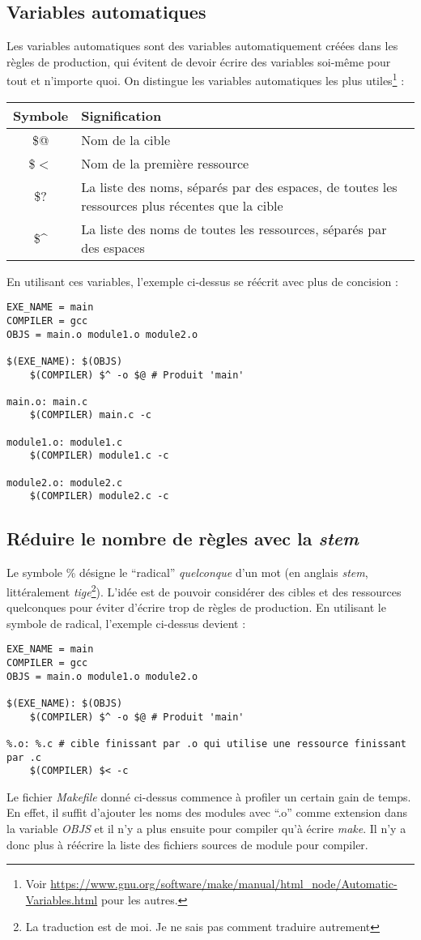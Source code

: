 \documentclass[../../../main.tex]{subfiles}
\begin{document}
\subsection{Variables automatiques}
Les variables automatiques sont des variables automatiquement créées dans les règles de production, qui évitent de devoir écrire des variables soi-même pour tout et n'importe quoi. On distingue les variables automatiques les plus utiles\footnote{Voir \url{https://www.gnu.org/software/make/manual/html_node/Automatic-Variables.html} pour les autres.} :
\begin{center}
\begin{tabular}{c|l}
Symbole & Signification \\
\hline
\$@ & Nom de la cible \\
\$$<$ & Nom de la première ressource \\
\$? & La liste des noms, séparés par des espaces, de toutes les ressources plus récentes que la cible \\
\$\^ & La liste des noms de toutes les ressources, séparés par des espaces
\end{tabular}
\end{center}
En utilisant ces variables, l'exemple ci-dessus se réécrit avec plus de concision :
\begin{verbatim}
EXE_NAME = main
COMPILER = gcc
OBJS = main.o module1.o module2.o

$(EXE_NAME): $(OBJS)
	$(COMPILER) $^ -o $@ # Produit 'main'

main.o: main.c
	$(COMPILER) main.c -c

module1.o: module1.c
	$(COMPILER) module1.c -c

module2.o: module2.c
	$(COMPILER) module2.c -c
\end{verbatim}
\subsection{Réduire le nombre de règles avec la \textit{stem}}
Le symbole \% désigne le ``radical'' \textit{quelconque} d'un mot (en anglais \textit{stem}, littéralement \textit{tige}\footnote{La traduction est de moi. Je ne sais pas comment traduire autrement}). L'idée est de pouvoir considérer des cibles et des ressources quelconques pour éviter d'écrire trop de règles de production. En utilisant le symbole de radical, l'exemple ci-dessus devient :
\begin{verbatim}
EXE_NAME = main
COMPILER = gcc
OBJS = main.o module1.o module2.o

$(EXE_NAME): $(OBJS)
	$(COMPILER) $^ -o $@ # Produit 'main'

%.o: %.c # cible finissant par .o qui utilise une ressource finissant par .c
	$(COMPILER) $< -c
\end{verbatim}
Le fichier \textit{Makefile} donné ci-dessus commence à profiler un certain gain de temps. En effet, il suffit d'ajouter les noms des modules avec ``.o'' comme extension dans la variable \textit{OBJS} et il n'y a plus ensuite pour compiler qu'à écrire \textit{make}. Il n'y a donc plus à réécrire la liste des fichiers sources de module pour compiler.
\end{document}
